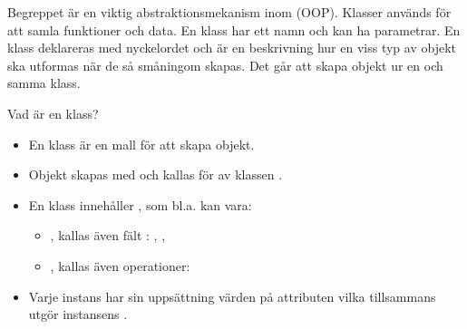 



\ifkompendium
Begreppet  är en viktig abstraktionsmekanism inom  (OOP). Klasser används för att samla funktioner och data. En klass har ett namn och kan ha parametrar. En klass deklareras med nyckelordet  och är en beskrivning hur en viss typ av objekt ska utformas när de så småningom skapas. Det går att skapa  objekt ur en och samma klass. 
\fi

\begin{Slide}{Vad är en klass?}
\begin{itemize}
\item En klass är en mall för att skapa objekt.
\item Objekt skapas med  och kallas för   av klassen .
\item En klass innehåller  , som bl.a. kan vara:
  \begin{itemize}
  \item {}, kallas även fält : , , 
  \item {}, kallas även operationer: 
  \end{itemize}
\item Varje instans har sin uppsättning värden på attributen
vilka tillsammans utgör instansens .
\end{itemize}

\end{Slide}



